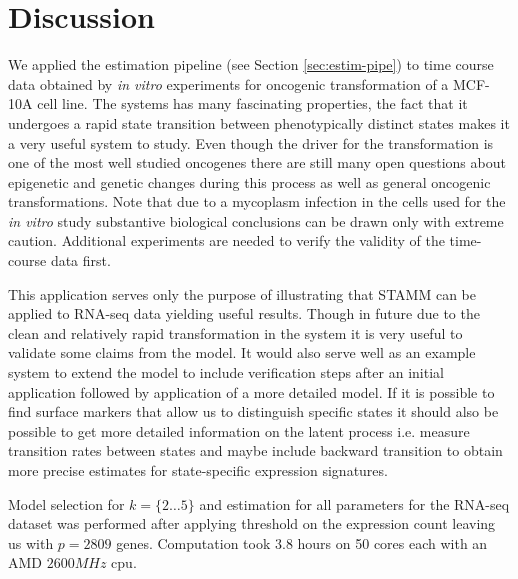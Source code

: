 \section{Discussion}
\label{sec:discussion-onco}

We applied the estimation pipeline (see Section \ref{sec:estim-pipe}) to time course data obtained by {\it in vitro} experiments for oncogenic transformation of a MCF-10A cell line. The systems has many fascinating properties, the fact that it undergoes a rapid state transition between phenotypically distinct states makes it a very useful system to study. Even though the driver for the transformation is one of the most well studied oncogenes there are still many open questions about epigenetic and genetic changes  during this process as well as general oncogenic transformations. Note that due to a mycoplasm infection in  the cells used for the {\it in vitro} study substantive  biological conclusions can be drawn only with extreme caution. Additional experiments are needed to verify the validity of the time-course data first. 

This application serves only the purpose of illustrating that STAMM can be applied to RNA-seq data yielding useful results. Though in future due to the clean and relatively rapid transformation in the system it is very useful to validate some claims from the model. It would also serve well as an example system to extend the model to include verification steps after an initial application followed by application of a more detailed model. If it is possible to find surface markers that allow us to distinguish specific states it should also be possible to get more detailed information on the latent process i.e. measure transition rates between states and maybe include backward transition to obtain more precise estimates for state-specific expression signatures.


Model selection for $k = \lbrace 2 \ldots 5 \rbrace$ and estimation for all parameters for the RNA-seq dataset was performed after applying threshold on the expression count leaving us with $p=2809$ genes. Computation took $3.8$ hours on 50 cores each with an AMD $2600MHz$ cpu. 



